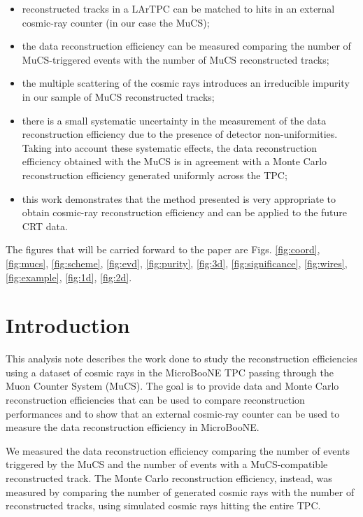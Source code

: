 \documentclass[a4paper]{scrartcl}
\begin{document}
\begin{itemize}
  \item reconstructed tracks in a LArTPC can be matched to hits in an external cosmic-ray counter (in our case the MuCS);
  \item the data reconstruction efficiency can be measured comparing the number of MuCS-triggered events with the number of MuCS reconstructed tracks;
  \item the multiple scattering of the cosmic rays introduces an irreducible impurity in our sample of MuCS reconstructed tracks;
  \item there is a small systematic uncertainty in the measurement of the data reconstruction efficiency due to the presence of detector non-uniformities.  Taking into account these systematic effects, the data reconstruction efficiency obtained with the MuCS is in agreement with a Monte Carlo reconstruction efficiency generated uniformly across the TPC;
  \item this work demonstrates that the method presented is very appropriate to obtain cosmic-ray reconstruction efficiency and can be applied to the future CRT data.

\end{itemize}

The figures that will be carried forward to the paper are Figs. \ref{fig:coord}, \ref{fig:mucs}, \ref{fig:scheme},  \ref{fig:evd}, \ref{fig:purity}, \ref{fig:3d}, \ref{fig:significance}, \ref{fig:wires}, \ref{fig:example}, \ref{fig:1d}, \ref{fig:2d}.

\clearpage{}
\section{Introduction}
This analysis note describes the work done to study the reconstruction efficiencies using a dataset of cosmic rays in the MicroBooNE TPC passing through the Muon Counter System (MuCS).
The goal is to provide data and Monte Carlo reconstruction efficiencies that can be used to compare reconstruction performances and to show that an external cosmic-ray counter can be used to measure the data reconstruction efficiency in MicroBooNE.

We measured the data reconstruction efficiency comparing the number of events triggered by the MuCS and the number of events with a MuCS-compatible reconstructed track.
The Monte Carlo reconstruction efficiency, instead, was measured by comparing the number of generated cosmic rays with the number of reconstructed tracks, using simulated cosmic rays hitting the entire TPC.
\end{document}
